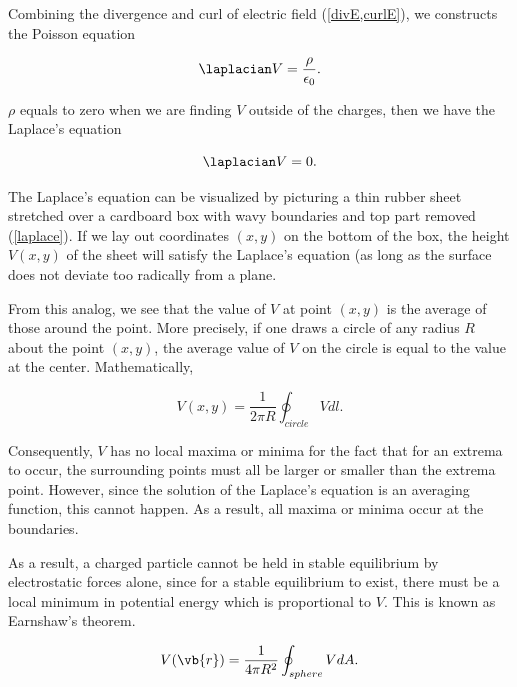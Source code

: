 \documentclass[a4paper,12pt]{report}
\begin{document}
	Combining the divergence and curl of electric field (\cref{divE,curlE}), we constructs the Poisson equation
	
	\begin{equation}
		\laplacian V = \frac{\rho }{\epsilon_0}.
	\end{equation}
	
	\(\rho \) equals to zero when we are finding \(V\) outside of the charges, then we have the Laplace's equation
	
	\begin{equation}
		\laplacian V = 0.
	\end{equation}
	
	The Laplace's equation can be visualized by picturing a thin rubber sheet stretched over a cardboard box with wavy boundaries and top part removed (\cref{laplace}). If we lay out coordinates \((x,y)\) on the bottom of the box, the height \(V(x,y)\) of the sheet will satisfy the Laplace's equation (as long as the surface does not deviate too radically from a plane.  
	
	From this analog, we see that the value of \(V\) at point \((x,y)\) is the average of those around the point. More precisely, if one draws a circle of any radius \(R\) about the point \((x,y)\), the average value of \(V\) on the circle is equal to the value at the center. Mathematically, 
	
	\begin{equation}
		V(x,y) = \frac{1}{2\pi R} \oint _{circle} Vdl.
	\end{equation}
	
	Consequently, \(V\) has no local maxima or minima for the fact that for an extrema to occur, the surrounding points must all be larger or smaller than the extrema point. However, since the solution of the Laplace's equation is an averaging function, this cannot happen. As a result, all maxima or minima occur at the boundaries.
	
	As a result, a charged particle cannot be held in stable equilibrium by electrostatic forces alone, since for a stable equilibrium to exist, there must be a local minimum in potential energy which is proportional to \(V\). This is known as Earnshaw's theorem.
	
	
	\begin{equation}
		V(\vb{r} ) = \frac{1}{4\pi R^2} \oint _{sphere} VdA.
	\end{equation}
	
\end{document}
